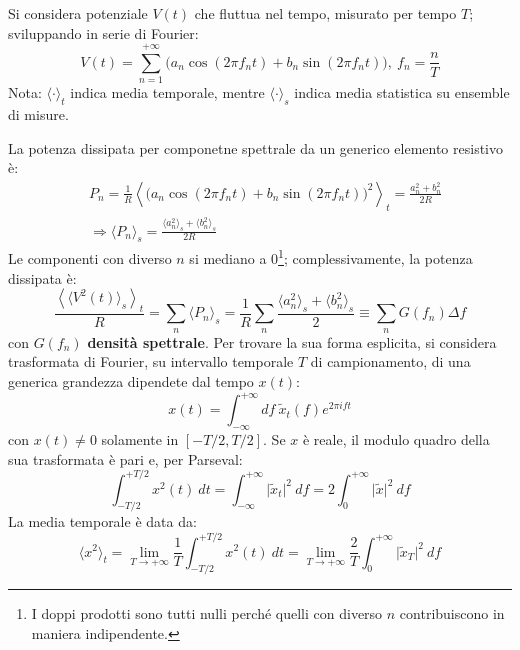 \documentclass[10pt, a4paper]{scrartcl}
\numberwithin{equation}{subsection}
\theoremstyle{style1}
\theoremstyle{style2}
\begin{document}
Si considera potenziale $V(t)$ che fluttua nel tempo, misurato per tempo $T$; sviluppando in serie di Fourier:
\begin{equation}
	V(t) = \sum_{n=1}^{+\infty} \big(a_n \cos(2 \pi f_n t) + b_n \sin (2\pi f_n t) \big), \ f_n = \frac{n}{T}
\end{equation}
Nota: $\langle \cdot  \rangle_t$ indica media temporale, mentre $\langle \cdot  \rangle_s$ indica media statistica su ensemble di misure.

La potenza dissipata per componetne spettrale da un generico elemento resistivo \`e:
\begin{equation}
	\begin{split}
		&P_n = \frac{1}{R} \left\langle \big(a_n \cos(2\pi f_n t) + b_n \sin(2\pi f_n t)\big)^2 \right\rangle_t = \frac{a_n^2 + b_n^2}{2R}\\
		&\Rightarrow \langle P_n \rangle_s = \frac{\langle a_n^2 \rangle_s + \langle b_n^2 \rangle_s}{2R}
	\end{split}
\end{equation}
Le componenti con diverso $n$ si mediano a $0$\footnote{I doppi prodotti sono tutti nulli perch\'e quelli con diverso $n$ contribuiscono in maniera indipendente.}; 
complessivamente, la potenza dissipata \`e:
\begin{equation}
	\frac{\left\langle \langle V^2(t) \rangle_s \right\rangle_t}{R} = \sum_{n}^{} \langle P_n \rangle_s = \frac{1}{R}\sum_{n}^{} \frac{\langle a_n^2 \rangle_s + \langle b_n^2 \rangle_s}{2} \equiv \sum_{n}^{} G(f_n) \Delta f
\end{equation}
con $G(f_n)$ \textbf{densit\`a spettrale}. 
Per trovare la sua forma esplicita, si considera trasformata di Fourier, su intervallo temporale $T$ di campionamento, di una generica grandezza dipendete dal tempo $x(t)$:
\begin{equation*}
	x(t) = \int_{-\infty} ^{+\infty} df \ \widetilde{x}_t (f) e^{2 \pi i f t} 
\end{equation*}
con $x(t) \neq 0$ solamente in $\left[ -T / 2, T / 2 \right] $.
Se $x$ \`e reale, il modulo quadro della sua trasformata \`e pari e, per Parseval:
\begin{equation*}
	\int_{-T / 2} ^{+T / 2} x^2 (t) \ dt = \int_{-\infty} ^{+\infty} \lvert \widetilde{x}_t \rvert ^2 \ df = 2 \int_{0} ^{+\infty} \lvert \widetilde{x} \rvert ^2 \ df
\end{equation*}
La media temporale \`e data da:
\[
\langle x^2 \rangle_t = \lim_{T \to +\infty} \frac{1}{ T } \int_{-T / 2} ^{+T / 2}  x^2 (t) \ dt = \lim_{T \to +\infty} \frac{2}{T} \int_{0} ^{+\infty} \lvert \widetilde{x}_T \rvert ^2 \ df
\] 
\end{document}
